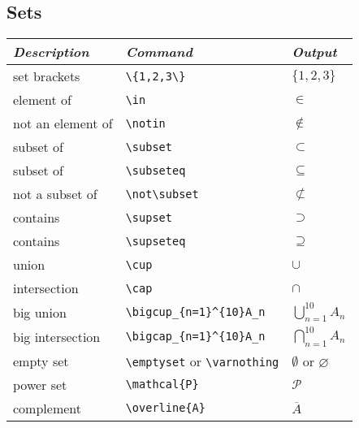 \documentclass[12pt]{article}
\theoremstyle{definition}
\begin{document}
\subsection{Sets}
\begin{tabular}{| l | l | l |} \hline
\textit{Description} & \textit{Command} & \textit{Output}\\ \hline
set brackets & \verb!\{1,2,3\}! & $\{1,2,3\}$\\ \hline
element of & \verb!\in! & $\in$\\ \hline
not an element of & \verb!\notin! & $\notin$\\ \hline
subset of & \verb!\subset! & $\subset$\\ \hline
subset of & \verb!\subseteq! & $\subseteq$\\ \hline
not a subset of & \verb!\not\subset! & $\not\subset$\\ \hline
contains & \verb!\supset! & $\supset$\\ \hline
contains & \verb!\supseteq! & $\supseteq$\\ \hline
union & \verb!\cup! & $\cup$\\ \hline
intersection & \verb!\cap! & $\cap$\\ \hline
big union & 
\verb!\bigcup_{n=1}^{10}A_n! &
$\displaystyle \bigcup_{n=1}^{10}A_{n}$\\ \hline %
big intersection & \verb!\bigcap_{n=1}^{10}A_n! &$\displaystyle \bigcap_{n=1}^{10}A_{n}$\\ \hline
empty set & \verb!\emptyset! or \verb+\varnothing+ & $\emptyset$ or $\varnothing$\\ \hline
power set & \verb!\mathcal{P}! & $\mathcal{P}$\\ \hline
complement & \verb!\overline{A}! & $\overline{A}$\\  \hline
\end{tabular}
\\
\end{document}
